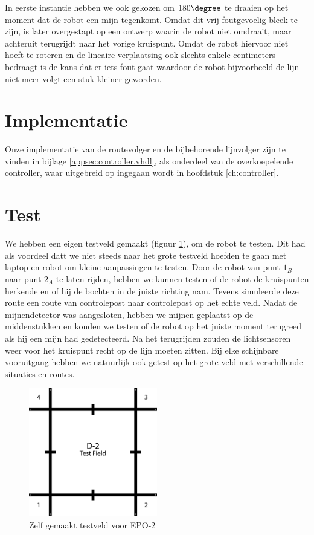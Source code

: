 \documentclass{report}
\begin{document}
In eerste instantie hebben we ook gekozen om $180\degree$ te draaien op het moment dat de robot een mijn tegenkomt. Omdat dit vrij foutgevoelig bleek te zijn, is later overgestapt op een ontwerp waarin de robot niet omdraait, maar achteruit terugrijdt naar het vorige kruispunt. Omdat de robot hiervoor niet hoeft te roteren en de lineaire verplaatsing ook slechts enkele centimeters bedraagt is de kans dat er iets fout gaat waardoor de robot bijvoorbeeld de lijn niet meer volgt een stuk kleiner geworden.

\section{Implementatie}
Onze implementatie van de routevolger en de bijbehorende lijnvolger zijn te vinden in bijlage \ref{appsec:controller.vhdl}, als onderdeel van de overkoepelende controller, waar uitgebreid op ingegaan wordt in hoofdstuk \ref{ch:controller}.

\section{Test}
We hebben een eigen testveld gemaakt (figuur \ref{fig:testfield}), om de robot te testen. Dit had als voordeel datt we niet steeds naar het grote testveld hoefden te gaan met laptop en robot om kleine aanpassingen te testen.
Door de robot van punt $1_B$ naar punt $2_A$ te laten rijden, hebben we kunnen testen of de robot de kruispunten herkende en of hij de bochten in de juiste richting nam. Tevens simuleerde deze route een route van controlepost naar controlepost op het echte veld.
Nadat de mijnendetector was aangesloten, hebben we mijnen geplaatst op de middenstukken en konden we testen of de robot op het juiste moment terugreed als hij een mijn had gedetecteerd. Na het terugrijden zouden de lichtsensoren weer voor het kruispunt recht op de lijn moeten zitten.
Bij elke schijnbare vooruitgang hebben we natuurlijk ook getest op het grote veld met verschillende situaties en routes.

\begin{figure}[H]
	\centering
	\includegraphics[width=0.5\textwidth]{d-2_test_field.png}
	\caption{Zelf gemaakt testveld voor EPO-2}
	\label{fig:testfield}
\end{figure}
\end{document}
